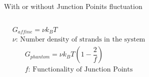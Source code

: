\documentclass[12pt, dvipdfmx]{beamer}
\begin{document}
\begin{frame}
		\begin{block}{With or without Junction Poinits fluctuation}
			\vspace{1mm}
			\begin{columns}[T, onlytextwidth]
				\small
				\vspace{-2mm}
				\scriptsize
				\begin{align*}
					&G_{affine} = \nu k_B T  \\
					&\text{$\nu$: Number density of strands in the system}
				\end{align*}
				\small
				\vspace{-2mm}
				\scriptsize
				\begin{align*}
					&G_{phantom} = \nu k_B T \left(1 - \dfrac{2}{f}\right) \\
					&\text{$f$: Functionality of Junction Points}
				\end{align*}
				\normalsize
			\end{columns}
		\end{block}
\end{frame}
\end{document}
